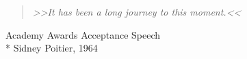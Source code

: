 \begin{quotation}
\emph{>>It has been a long journey to this moment.<<}
\end{quotation}
\begin{minipage}{.7\textwidth}
	\begin{flushright}
		Academy Awards Acceptance Speech\\*
		Sidney Poitier, 1964
	\end{flushright}
\end{minipage}
